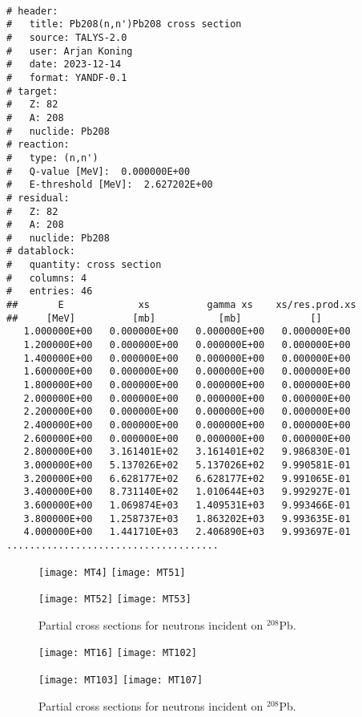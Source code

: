 {\small \begin{verbatim}

# header:
#   title: Pb208(n,n')Pb208 cross section
#   source: TALYS-2.0
#   user: Arjan Koning
#   date: 2023-12-14
#   format: YANDF-0.1
# target:
#   Z: 82
#   A: 208
#   nuclide: Pb208
# reaction:
#   type: (n,n')
#   Q-value [MeV]:  0.000000E+00
#   E-threshold [MeV]:  2.627202E+00
# residual:
#   Z: 82
#   A: 208
#   nuclide: Pb208
# datablock:
#   quantity: cross section
#   columns: 4
#   entries: 46
##       E             xs          gamma xs    xs/res.prod.xs
##     [MeV]          [mb]           [mb]            []
   1.000000E+00   0.000000E+00   0.000000E+00   0.000000E+00
   1.200000E+00   0.000000E+00   0.000000E+00   0.000000E+00
   1.400000E+00   0.000000E+00   0.000000E+00   0.000000E+00
   1.600000E+00   0.000000E+00   0.000000E+00   0.000000E+00
   1.800000E+00   0.000000E+00   0.000000E+00   0.000000E+00
   2.000000E+00   0.000000E+00   0.000000E+00   0.000000E+00
   2.200000E+00   0.000000E+00   0.000000E+00   0.000000E+00
   2.400000E+00   0.000000E+00   0.000000E+00   0.000000E+00
   2.600000E+00   0.000000E+00   0.000000E+00   0.000000E+00
   2.800000E+00   3.161401E+02   3.161401E+02   9.986830E-01
   3.000000E+00   5.137026E+02   5.137026E+02   9.990581E-01
   3.200000E+00   6.628177E+02   6.628177E+02   9.991065E-01
   3.400000E+00   8.731140E+02   1.010644E+03   9.992927E-01
   3.600000E+00   1.069874E+03   1.409531E+03   9.993466E-01
   3.800000E+00   1.258737E+03   1.863202E+03   9.993635E-01
   4.000000E+00   1.441710E+03   2.406890E+03   9.993697E-01
.....................................
\end{verbatim} } \renewcommand{\baselinestretch}{1.07}\small\normalsize
\noindent
\begin{figure}
\vspace*{-5mm}
\centerline{
\centering\texttt{[image: MT4]} \centering\texttt{[image: MT51]}
}
\centerline{
\centering\texttt{[image: MT52]} \centering\texttt{[image: MT53]}
}
\caption{Partial cross sections for neutrons incident on ${}^{208}$Pb.}
\label{pbpart1}
\end{figure}
\begin{figure}
\vspace*{-15mm}
\centerline{
\centering\texttt{[image: MT16]} \centering\texttt{[image: MT102]}
}
\centerline{
\centering\texttt{[image: MT103]} \centering\texttt{[image: MT107]}
}
\caption{Partial cross sections for neutrons incident on ${}^{208}$Pb.}
\label{pbpart2}
\end{figure}

